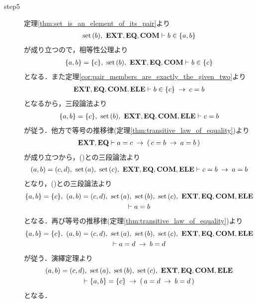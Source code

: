 \begin{sketch}
\begin{description}
			\item[step5]
				定理\ref{thm:set_is_an_element_of_its_pair}より
				\begin{align}
					\operatorname*{set}\hspace{0.15em}(b),\ \mbox{{\bf EXT}},\mbox{{\bf EQ}},\mbox{\bf COM} \vdash b \in \{a,b\}
					\label{fom:equality_of_ordered_pairs_8}
				\end{align}
				が成り立つので，相等性公理より
				\begin{align}
					\{a,b\} = \{c\},\ \operatorname*{set}\hspace{0.15em}(b),\ \mbox{{\bf EXT}},\mbox{{\bf EQ}},\mbox{\bf COM} \vdash b \in \{c\}
				\end{align}
				となる．また定理\ref{cor:pair_members_are_exactly_the_given_two}より
				\begin{align}
					\mbox{{\bf EXT}},\mbox{{\bf EQ}},\mbox{\bf COM},\mbox{{\bf ELE}} \vdash b \in \{c\} \hspace{0.25em}\rightarrow\hspace{0.25em} c = b
				\end{align}
				となるから，三段論法より
				\begin{align}
					\{a,b\} = \{c\},\ \set{b},\ \EXTAX,\EQAX,\COMAX,\ELEAX \vdash c = b
					\label{fom:equality_of_ordered_pairs_6}
				\end{align}
				が従う．他方で等号の推移律(定理\ref{thm:transitive_law_of_equality})より
				\begin{align}
					\mbox{{\bf EXT}},\mbox{{\bf EQ}} \vdash a = c \hspace{0.25em}\rightarrow\hspace{0.25em} (\, c = b \hspace{0.25em}\rightarrow\hspace{0.25em} a = b\, )
				\end{align}
				が成り立つから，()との三段論法より
				\begin{align}
					(a,b) = (c,d),\ \set{a},\ \set{c},\ \EXTAX,\EQAX,\COMAX,\ELEAX \vdash c = b \rarrow a = b
					\label{fom:equality_of_ordered_pairs_11}
				\end{align}
				となり，()との三段論法より
				\begin{align}
					\begin{gathered}
						\{a,b\} = \{c\},\ (a,b) = (c,d),\ \set{a},\ \set{b},\ \set{c},\ \EXTAX,\EQAX,\COMAX,\ELEAX \\
						\vdash a = b
					\end{gathered}
				\end{align}
				となる．再び等号の推移律(定理\ref{thm:transitive_law_of_equality})より
				\begin{align}
					\begin{gathered}
						\{a,b\} = \{c\},\ (a,b) = (c,d),\ \set{a},\ \set{b},\ \set{c},\ 
						\EXTAX,\EQAX,\COMAX,\ELEAX \\
						\vdash a = d \rarrow b = d
					\end{gathered}
					\label{fom:equality_of_ordered_pairs_7}
				\end{align}
				が従う．演繹定理より
				\begin{align}
					\begin{gathered}
						(a,b) = (c,d),\ \set{a},\ \set{b},\ \set{c},\ 
						\EXTAX,\EQAX,\COMAX,\ELEAX \\ 
						\vdash \{a,b\} = \{c\} \rarrow (\, a = d \rarrow b = d\, )
					\end{gathered}
					\label{fom:equality_of_ordered_pairs_9}
				\end{align}
				となる．
				

\end{description}
\end{sketch}
